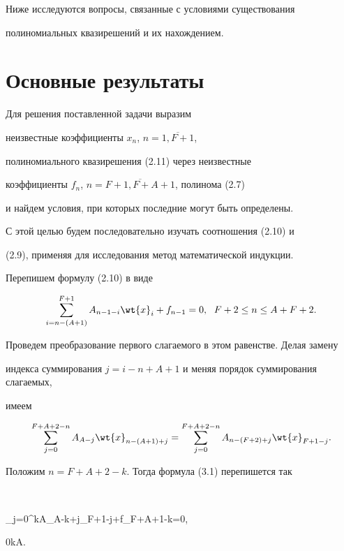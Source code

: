 Ниже исследуются вопросы, связанные с условиями существования


полиномиальных квазирешений и их нахождением.





\section {Основные результаты}





Для решения поставленной задачи выразим


неизвестные коэффициенты $x_{n}$, $n=\overline{1,F+1}$,


полиномиального квазирешения (2.11) через неизвестные


коэффициенты $f_{n}$, $n=\overline{F+1,F+A+1}$, полинома (2.7)


и найдем условия, при которых последние могут быть определены.


С этой целью будем последовательно изучать соотношения (2.10) и


(2.9), применяя для исследования метод математической индукции.





Перепишем формулу (2.10) в виде


\begin{equation}


\sum_{i=n-(A+1)}^{F+1}A_{n-1-i}\wt{x}_{i}+f_{n-1}=0,\ \;


F+2\leq n\leq A+F+2.


\end{equation}


Проведем преобразование первого слагаемого в этом равенстве. Делая замену


индекса  суммирования $j=i-n+A+1$ и меняя порядок суммирования слагаемых,


имеем


$$


\sum_{j=0}^{F+A+2-n}A_{A-j}\wt{x}_{n-(A+1)+j}=


\sum_{j=0}^{F+A+2-n}A_{n-(F+2)+j}\wt{x}_{F+1-j}.


$$


Положим $n=F+A+2-k$. Тогда формула (3.1) перепишется так


$$


\sum_{j=0}^{k}A_{A-k+j}_{F+1-j}+f_{F+A+1-k}=0,\ \;


0\leq k\leq A.


